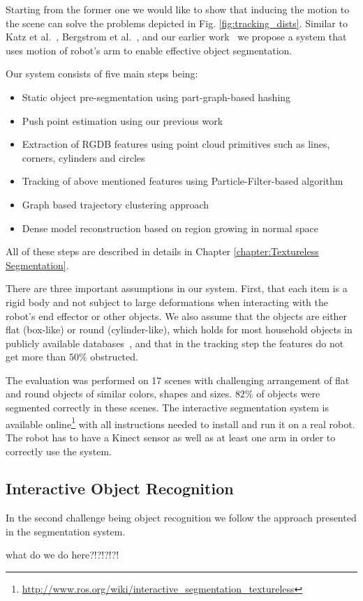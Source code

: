 Starting from the former one we would like to show that inducing the motion to the scene can solve the problems depicted in Fig. \ref{fig:tracking_dists}. Similar  to Katz  et al.~\cite{Katz-WS-MM-ICRA2011}, Bergstrom et
al.~\cite{bergstrom11icvs}, and our earlier
work~\cite{bersch12interactive} we propose a system that uses
motion of robot's arm to enable effective
object  segmentation.

Our system consists of five main steps being:

\begin{itemize} 
\item Static object pre-segmentation using part-graph-based hashing ~\cite{marton12SC}
\item Push point estimation using our previous work ~\cite{bersch12interactive}
\item Extraction of RGDB features using point cloud primitives such as lines, corners, cylinders and circles
\item Tracking of above mentioned features using Particle-Filter-based algorithm
\item Graph based trajectory clustering approach
\item Dense model reconstruction based on region growing in normal space
\end{itemize} 


All of these steps are described in details in Chapter \ref{chapter:Textureless Segmentation}. 


There are three important assumptions in our system. First, that each item is a rigid  body and not subject
to large deformations when  interacting with  the robot's  end  effector or
other objects. We also assume that the objects are either flat (box-like) or round (cylinder-like),
which holds for most household objects in publicly available databases~\cite{marton11ijrr}, and
that in the tracking step the features do not get more than $50\%$ obstructed.

The evaluation was performed on 17 scenes with challenging arrangement of flat and
round objects of similar colors, shapes and sizes. $82\%$ of objects
were segmented correctly in these scenes. The interactive segmentation system is available online\footnote{\url{http://www.ros.org/wiki/interactive_segmentation_textureless}} with all instructions needed to install and run it on a real robot. The robot has to have a Kinect sensor as well as at least one arm in order to correctly use the system.

\subsection{Interactive Object Recognition} 

In the second challenge being object recognition we follow the approach presented in the segmentation system. 



 what do we do here?!?!?!?!














